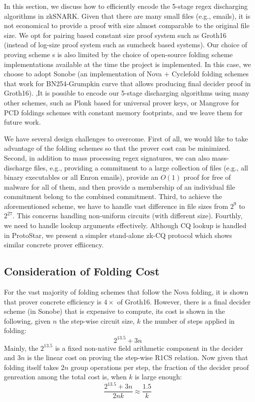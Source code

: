 In this section, we discuss how to efficiently encode the
5-stage regex discharging algorithms in zkSNARK. Given that
there are many small files (e.g., emails), it is not economical
to provide a proof with size almost comparable to the original
file size. We opt for pairing based constant size proof system
such as Groth16 (instead of log-size proof system such as sumcheck
based systems). Our choice of proving scheme s is also limited
by the choice of open-source folding scheme implementations available
at the time the project is implemented.
In this case, we choose to adopt Sonobe (an implementation of
Nova + Cyclefold folding schemes that work for BN254-Grumpkin curve
that allows producing final decider proof in Groth16). 
,It is possible to encode our 5-stage discharging algorithms using
many other schemes, such as Plonk based for universal prover keys,
or Mangrove for PCD foldings schemes with constant memory footprints,
and we leave them for future work.

We have several design challenges to overcome.
First of all, we would like to take advantage of
the folding schemes so that the prover cost can be
minimized. Second, in addition to mass processing regex signatures,
we can also mass-discharge files, e.g., providing
a commitment to a large collection of files (e.g., all binary executables
or all Enron emails), provide an $O(1)$ proof for free of
malware for all of them, and then provide a membership 
of an individual file commitment belong to the combined commitment.
Third, to achieve the aforementioned scheme, we have to
handle vast difference in file sizes from $2^{9}$ to $2^{27}$.
This concerns handling non-uniform circuits (with different size).
Fourthly, we need to handle lookup arguments effectively.
Although CQ lookup is handled in ProtoStar, we present
a simpler stand-alone zk-CQ protocol which shows similar
concrete prover effiicency.

\subsection{Consideration of Folding Cost}
For the vast majority of folding schemes that follow the Nova folding,
it is shown that prover concrete efficiency is $4\times$ of Groth16.
However, there is a final decider scheme (in Sonobe) that is expensive
to compute, its cost is shown in the following, given $n$ the step-wise
circuit size, $k$ the number of steps applied in folding: 
\[
	2^{13.5} + 3n
\]
Mainly, the $2^{13.5}$ is a fixed non-native field arithmetic component in the decider and $3n$ is the linear cost on proving the step-wise R1CS relation.
Now given that folding itself takes $2n$ group operations per step, the fraction of the decider proof genreation among the total cost is, when $k$ is large enough:
\[
\frac{2^{13.5} + 3n}{2nk} \approx \frac{1.5}{k}
\]

